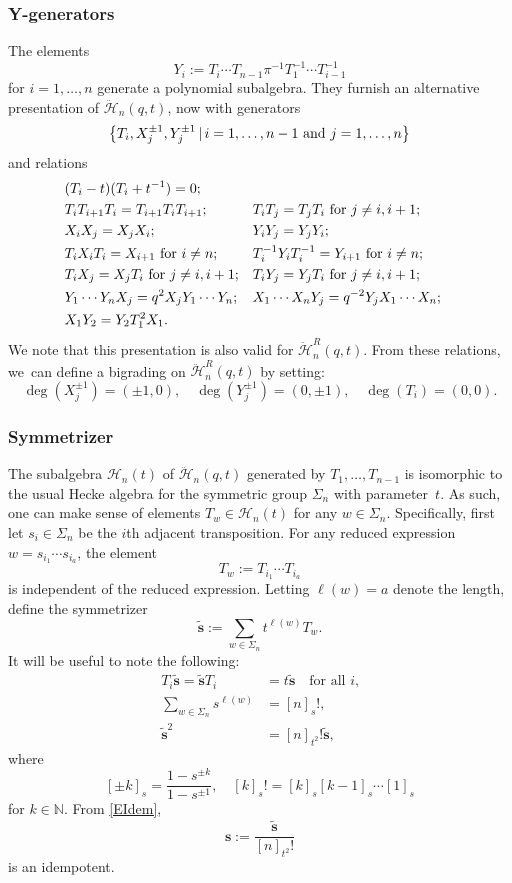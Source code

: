 \documentclass[JEP,XML,SOM,Unicode,published]{cedram}
\theoremstyle{definition}
\newcommand{\NN}{\mathbb{N}}
\newcommand{\HH}{\ddot{\mathcal{H}}}
\newcommand{\Hecke}{\mathcal{H}}
\newcommand{\ee}{\boldsymbol{s}}
\begin{document}
\subsubsection{Y-generators}\label{YGen}
The elements
\begin{equation}
Y_i:= T_i\cdots T_{n-1}\pi^{-1} T_1^{-1}\cdots T_{i-1}^{-1}
\label{YDef}
\end{equation}
for $i=1,\ldots,n$ generate a polynomial subalgebra.
They furnish an alternative presentation of $\HH_n(q,t)$, now with generators
\[
\left\{ T_i, X_j^{\pm 1}, Y_j^{\pm 1} \, | \, i=1,\ldots, n-1\hbox{ and }j=1,\ldots, n\right\}
\]
and relations
\begin{equation}
\begin{aligned}
&(T_i-t)(T_i+t^{-1})=0;\\
&T_iT_{i+1}T_i=T_{i+1}T_iT_{i+1};&& T_iT_j=T_jT_i\hbox{ for }j\not=i, i+1;\\
&X_iX_j=X_jX_i; && Y_iY_j=Y_jY_i;\\
&T_i X_i T_i=X_{i+1}\hbox{ for }i\not=n; && T_i^{-1}Y_iT_i^{-1}=Y_{i+1}\hbox{ for }i\not=n;\\
&T_iX_j=X_jT_i\hbox{ for }j\not=i, i+1;&&T_iY_j=Y_jT_i\hbox{ for }j\not=i, i+1;\\
&Y_1\cdots Y_nX_j=q^2X_jY_1\cdots Y_n;&& X_1\cdots X_nY_j=q^{-2}Y_jX_1\cdots X_n;\\
&X_1Y_2=Y_2T^2_1X_1.
\end{aligned}
\label{DAHAY}
\end{equation}
We note that this presentation is also valid for $\HH_n^R(q,t)$.
From these relations, we~can define a bigrading on $\HH_n^R(q,t)$ by setting:
\[
\deg(X_j^{\pm 1})= (\pm 1,0),\quad
\deg(Y_j^{\pm 1})= (0,\pm 1),\quad
\deg(T_i)= (0,0).
\]

\subsubsection{Symmetrizer}\label{Symmetrizer}
The subalgebra $\Hecke_n(t)$ of $\HH_n(q,t)$ generated by $T_1,\ldots, T_{n-1}$ is isomorphic to the usual Hecke algebra for the symmetric group $\Sigma_n$ with parameter~$t$.
As such, one can make sense of elements $T_w\in\Hecke_n(t)$ for any $w\in \Sigma_n$.
Specifically, first let $s_{i}\in\Sigma_n$ be the $i$th adjacent transposition.
For any reduced expression $w=s_{i_1}\cdots s_{i_a}$, the element
\[
T_w:=T_{i_1}\cdots T_{i_a}
\]
is independent of the reduced expression.
Letting $\ell(w)=a$ denote the length, define the symmetrizer
\[
\tilde{\ee}:=\sum_{w\in\Sigma_n}t^{\ell(w)}T_w.
\]
It will be useful to note the following:
\begin{align}
T_i\tilde{\ee}=\tilde{\ee} T_i&= t\tilde{\ee}\quad\text{for all $i$,}\label{EAbsorb}\\
\sum_{w\in \Sigma_n}s^{\ell(w)}&=[n]_s!,\nonumber\\[
-3pt]
\tilde{\ee}^2&=[n]_{t^2}!\tilde{\ee},\label{EIdem}
\end{align}
where
\[
[\pm k]_s=\frac{1-s^{\pm k}}{1-s^{\pm 1}},\quad [k]_s!=[k]_s[k-1]_s\cdots [1]_s
\]
for $k\in\NN$.
From \eqref{EIdem},
\[
\ee:=\frac{\tilde{\ee}}{[n]_{t^2}!}
\]
is an idempotent.
\end{document}
